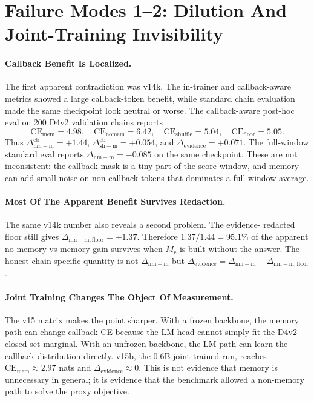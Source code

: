 \documentclass{article}
\newcommand{\Mc}{M_{\mathrm{c}}}
\newcommand{\dnm}{\Delta_{\mathrm{nm-m}}}
\newcommand{\dsh}{\Delta_{\mathrm{sh-m}}}
\newcommand{\CEmem}{\mathrm{CE}_{\mathrm{mem}}}
\newcommand{\CEnomem}{\mathrm{CE}_{\mathrm{nomem}}}
\newcommand{\CEsh}{\mathrm{CE}_{\mathrm{shuffle}}}
\newcommand{\CEfloor}{\mathrm{CE}_{\mathrm{floor}}}
\newcommand{\elift}{\Delta_{\mathrm{evidence}}}
\begin{document}
\section{Failure Modes 1--2: Dilution And Joint-Training Invisibility}

\paragraph{Callback Benefit Is Localized.}
The first apparent contradiction was v14k.  The in-trainer and
callback-aware metrics showed a large callback-token benefit, while
standard chain evaluation made the same checkpoint look neutral or
worse.  The callback-aware post-hoc eval on 200 D4v2 validation chains
reports
\[
\CEmem=4.98,\quad
\CEnomem=6.42,\quad
\CEsh=5.04,\quad
\CEfloor=5.05.
\]
Thus $\dnm^{\mathrm{cb}}=+1.44$, $\dsh^{\mathrm{cb}}=+0.054$, and
$\elift=+0.071$.  The full-window standard eval reports $\dnm=-0.085$
on the same checkpoint.  These are not inconsistent: the callback mask
is a tiny part of the score window, and memory can add small noise on
non-callback tokens that dominates a full-window average.

\paragraph{Most Of The Apparent Benefit Survives Redaction.}
The same v14k number also reveals a second problem.  The evidence-
redacted floor still gives $\Delta_{\mathrm{nm-m,floor}}=+1.37$.  Therefore
$1.37/1.44 = 95.1\%$ of the apparent no-memory vs memory gain survives
when $\Mc$ is built without the answer.  The honest chain-specific
quantity is not $\dnm$ but
$\elift=\dnm-\Delta_{\mathrm{nm-m,floor}}$.

\paragraph{Joint Training Changes The Object Of Measurement.}
The v15 matrix makes the point sharper.  With a frozen backbone, the
memory path can change callback CE because the LM head cannot simply
fit the D4v2 closed-set marginal.  With an unfrozen backbone, the LM
path can learn the callback distribution directly.  v15b, the 0.6B
joint-trained run, reaches $\CEmem \approx 2.97$ nats and
$\elift \approx 0$.  This is not evidence that memory is unnecessary in
general; it is evidence that the benchmark allowed a non-memory path to
solve the proxy objective.
\end{document}
